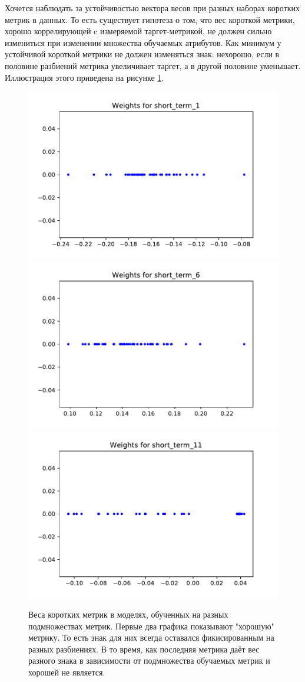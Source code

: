 \documentclass{article}
\begin{document}
	Хочется наблюдать за устойчивостью вектора весов при разных наборах коротких метрик в данных. То есть существует гипотеза о том, что вес короткой метрики, хорошо коррелирующей c измеряемой таргет-метрикой, не должен сильно измениться при изменении множества обучаемых атрибутов. Как минимум у устойчивой короткой метрики не должен изменяться знак: нехорошо, если в половине разбиений метрика увеличивает таргет, а в другой половине уменьшает. Иллюстрация этого приведена на рисунке \ref{fig:weight_dispersion}.
	
	\begin{figure}[htp]
		
		\centering
		\includegraphics[width=.6\textwidth]{weights_short_term_1.pdf}\hfill
		\includegraphics[width=.6\textwidth]{weights_short_term_6.pdf}\hfill
		\includegraphics[width=.6\textwidth]{weights_short_term_11.pdf}
		
		\caption{Веса коротких метрик в моделях, обученных на разных подмножествах метрик. Первые два графика показывают "хорошую" метрику. То есть знак для них всегда оставался фикисированным на разных разбиениях. В то время, как последняя метрика даёт вес разного знака в зависимости от подмножества обучаемых метрик и хорошей не является.}
		\label{fig:weight_dispersion}
	\end{figure}



	
\end{document}
